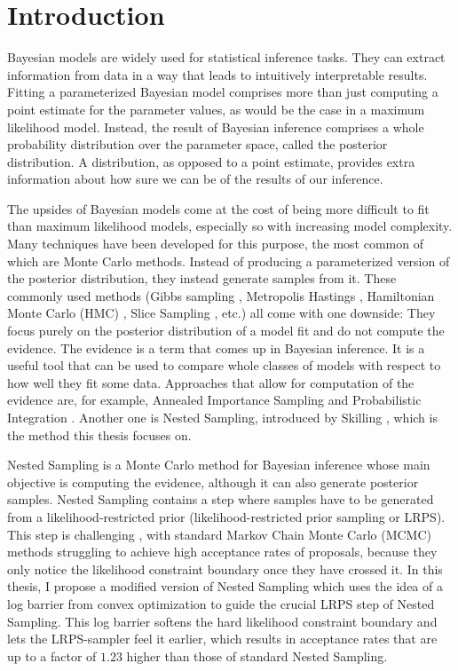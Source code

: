 \documentclass[12pt, a4paper]{report}
\begin{document}
\chapter*{Introduction}
Bayesian models are widely used for statistical inference tasks.
They can extract information from data in a way that leads to intuitively interpretable results.
Fitting a parameterized Bayesian model comprises more than just computing a point estimate for the parameter values, as would be the case in a maximum likelihood model.
Instead, the result of Bayesian inference comprises a whole probability distribution over the parameter space, called the posterior distribution.
A distribution, as opposed to a point estimate, provides extra information about how sure we can be of the results of our inference. 

The upsides of Bayesian models come at the cost of being more difficult to fit than maximum likelihood models, especially so with increasing model complexity.
Many techniques have been developed for this purpose, the most common of which are Monte Carlo methods.
Instead of producing a parameterized version of the posterior distribution, they instead generate samples from it.
These commonly used methods (Gibbs sampling \cite{gibbs}, Metropolis Hastings \cite{metropolishastings}, Hamiltonian Monte Carlo (HMC) \cite{hmc}, Slice Sampling \cite{slice_sampling}, etc.) all come with one downside:
They focus purely on the posterior distribution of a model fit and do not compute the evidence.
The evidence is a term that comes up in Bayesian inference.
It is a useful tool that can be used to compare whole classes of models with respect to how well they fit some data.
Approaches that allow for computation of the evidence are, for example, Annealed Importance Sampling \cite{annealed_importance_sampling} and Probabilistic Integration \cite{bayesian_cubature}.
Another one is Nested Sampling, introduced by Skilling \cite{skilling}, which is the method this thesis focuses on.

Nested Sampling is a Monte Carlo method for Bayesian inference whose main objective is computing the evidence, although it can also generate posterior samples.
Nested Sampling contains a step where samples have to be generated from a likelihood-restricted prior (likelihood-restricted prior sampling or LRPS).
This step is challenging \cite[9]{hmc_in_ns}, with standard Markov Chain Monte Carlo (MCMC) methods struggling to achieve high acceptance rates of proposals, because they only notice the likelihood constraint boundary once they have crossed it.
In this thesis, I propose a modified version of Nested Sampling which uses the idea of a log barrier from convex optimization to guide the crucial LRPS step of Nested Sampling.
This log barrier softens the hard likelihood constraint boundary and lets the LRPS-sampler feel it earlier, which results in acceptance rates that are up to a factor of $1.23$ higher than those of standard Nested Sampling.
\end{document}
